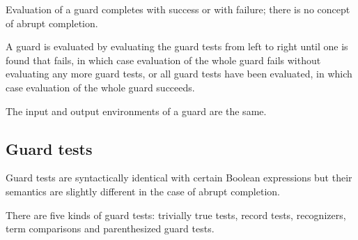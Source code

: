 \SYNTAX

\begin{rules}
       { \OR
         \TXT{,} }
\end{rules}

\EVALUATION

Evaluation of a guard completes with success or with failure; there is
no concept of abrupt completion.

A guard is evaluated by evaluating the guard tests from left to right
until one is found that fails, in which case evaluation of the whole
guard fails without evaluating any more guard tests, or all guard
tests have been evaluated, in which case evaluation of the whole guard
succeeds.

\ENVIRONMENTS

The input and output environments of a guard are the same.

\subsection{Guard tests}

\label{section:record-guards}

Guard tests are syntactically identical with certain Boolean
expressions but their semantics are slightly different in the case of
abrupt completion.

There are five kinds of guard tests: trivially true tests,
record tests, recognizers, term comparisons and parenthesized guard tests.

\SYNTAX

\begin{rules}
       { \OR
         \OR
\ifstruct        {} \OR \fi
         \OR
         \OR
        }

       { \TXT{(}  \TXT{,}  \TXT{)}}

\ifstruct
{}
       { \TXT{(}  \TXT{,}  \TXT{)}}
\fi

       { \TXT{(}  \TXT{)}}

       {}

       {   \OR
          }

       {\TXT{(}  \TXT{)}}
\end{rules}

